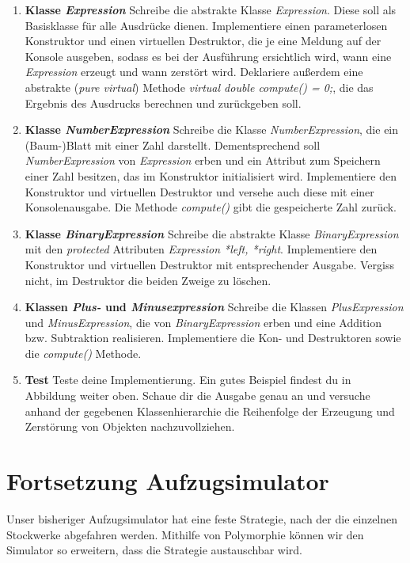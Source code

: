 \begin{enumerate}

\item \textbf{Klasse \emph{Expression}}
Schreibe die abstrakte Klasse \emph{Expression}.
Diese soll als Basisklasse für alle Ausdrücke dienen.
Implementiere einen parameterlosen Konstruktor und einen virtuellen Destruktor, die je eine Meldung auf der Konsole ausgeben, sodass es bei der Ausführung ersichtlich wird, wann eine \emph{Expression} erzeugt und wann zerstört wird.
Deklariere außerdem eine abstrakte (\emph{pure virtual}) Methode \emph{virtual double compute() = 0;}, die das Ergebnis des Ausdrucks berechnen und zurückgeben soll. 

\item \textbf{Klasse \emph{NumberExpression}}
Schreibe die Klasse \emph{NumberExpression}, die ein (Baum-)Blatt mit einer Zahl darstellt.
Dementsprechend soll \emph{NumberExpression} von \emph{Expression} erben und ein Attribut zum Speichern einer Zahl besitzen, das im Konstruktor initialisiert wird.
Implementiere den Konstruktor und virtuellen Destruktor und versehe auch diese mit einer Konsolenausgabe.
Die Methode \emph{compute()} gibt die gespeicherte Zahl zurück.

\item \textbf{Klasse \emph{BinaryExpression}}
Schreibe die abstrakte Klasse \emph{BinaryExpression} mit den \emph{protected} Attributen \emph{Expression *left, *right}.
Implementiere den Konstruktor und virtuellen Destruktor mit entsprechender Ausgabe.
Vergiss nicht, im Destruktor die beiden Zweige zu löschen. 

\item \textbf{Klassen \emph{Plus-} und \emph{Minusexpression}}
Schreibe die Klassen \emph{PlusExpression} und \emph{MinusExpression}, die von \emph{BinaryExpression} erben und eine Addition bzw. Subtraktion realisieren. 
Implementiere die Kon- und Destruktoren sowie die \emph{compute()} Methode.

\item \textbf{Test}
Teste deine Implementierung.
Ein gutes Beispiel findest du in Abbildung weiter oben.
Schaue dir die Ausgabe genau an und versuche anhand der gegebenen Klassenhierarchie die Reihenfolge der Erzeugung und Zerstörung von Objekten  nachzuvollziehen.

\end{enumerate}

\section{Fortsetzung Aufzugsimulator}
Unser bisheriger Aufzugsimulator hat eine feste Strategie, nach der die einzelnen Stockwerke abgefahren werden. Mithilfe von Polymorphie können wir den Simulator so erweitern, dass die Strategie austauschbar wird.  

